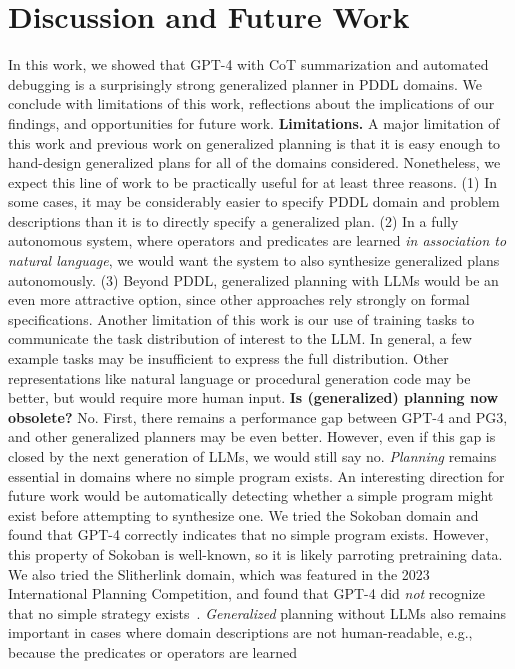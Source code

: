 \documentclass[letterpaper]{article} %
\begin{document}
\vspace{-3.02mm}
\section{Discussion and Future Work}

In this work, we showed that GPT-4 with CoT summarization and automated debugging is a surprisingly strong generalized planner in PDDL domains.
We conclude with limitations of this work, reflections about the implications of our findings, and opportunities for future work.  \textbf{Limitations.}
A major limitation of this work and previous work on generalized planning is that it is easy enough to hand-design generalized plans for all of the domains considered.
Nonetheless, we expect this line of work to be practically useful for at least three reasons.
(1) In some cases, it may be considerably easier to specify PDDL domain and problem descriptions than it is to directly specify a generalized plan.
(2) In a fully autonomous system, where operators and predicates are learned \emph{in association to natural language}, we would want the system to also synthesize generalized plans autonomously.
(3) Beyond PDDL, generalized planning with LLMs would be an even more attractive option, since other approaches rely strongly on formal specifications.
Another limitation of this work is our use of training tasks to communicate the task distribution of interest to the LLM.
In general, a few example tasks may be insufficient to express the full distribution.
Other representations like natural language or procedural generation code may be better, but would require more human input.  \textbf{Is (generalized) planning now obsolete?}
No.
First, there remains a performance gap between GPT-4 and PG3, and other generalized planners may be even better.
However, even if this gap is closed by the next generation of LLMs, we would still say no.
\emph{Planning} remains essential in domains where no simple program exists.
An interesting direction for future work would be automatically detecting whether a simple program might exist before attempting to synthesize one.
We tried the Sokoban domain and found that GPT-4 correctly indicates that no simple program exists.
However, this property of Sokoban is well-known, so it is likely parroting pretraining data.
We also tried the Slitherlink domain, which was featured in the 2023 International Planning Competition, and found that GPT-4 did \emph{not} recognize that no simple strategy exists~\cite{Yato2003OnTN}.
\emph{Generalized} planning without LLMs also remains important in cases where domain descriptions are not human-readable, e.g., because the predicates or operators are learned
\end{document}
